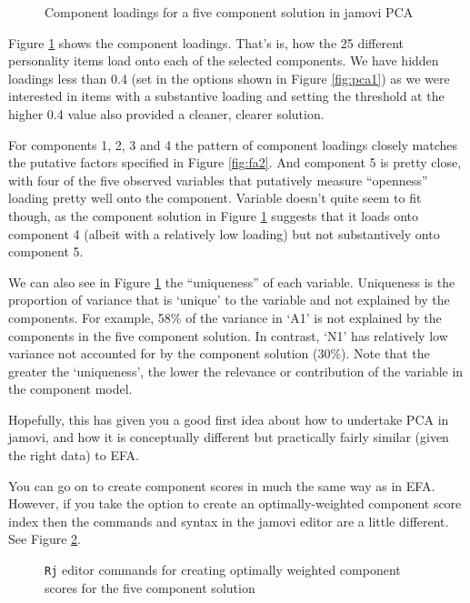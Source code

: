 \begin{figure}[!htb]
\begin{center}
\caption{Component loadings for a five component solution in jamovi PCA}
\label{fig:pca5}
\HR
\end{center}
\end{figure}

Figure \ref{fig:pca5} shows the component loadings. That's is, how the 25 different personality items load onto each of the selected components. We have hidden loadings less than 0.4 (set in the options shown in Figure \ref{fig:pca1}) as we were interested in items with a substantive loading and setting the threshold at the higher 0.4 value also provided a cleaner, clearer solution. 

For components 1, 2, 3 and 4 the pattern of component loadings closely matches the putative factors specified in Figure \ref{fig:fa2}. And component 5 is pretty close, with four of the five observed variables that putatively measure “openness” loading pretty well onto the component. Variable  doesn’t quite seem to fit though, as the component solution in Figure \ref{fig:pca5} suggests that it loads onto component 4 (albeit with a relatively low loading) but not substantively onto component 5.

We can also see in Figure \ref{fig:pca5} the “uniqueness” of each variable. Uniqueness is the proportion of variance that is ‘unique’ to the variable and not explained by the components. For example, 58\% of the variance in ‘A1’ is not explained by the components in the five component solution. In contrast, ‘N1’ has relatively low variance not accounted for by the component solution (30\%). Note that the greater the ‘uniqueness’, the lower the relevance or contribution of the variable in the component model. 

Hopefully, this has given you a good first idea about how to undertake PCA in jamovi, and how it is conceptually different but practically fairly similar (given the right data) to EFA.

You can go on to create component scores in much the same way as in EFA. However, if you take the option to create an optimally-weighted component score index then the commands and syntax in the jamovi  editor are a little different. See Figure \ref{fig:pca6}. 

\begin{figure}[!htb]
\begin{center}
\caption{\texttt{Rj} editor commands for creating optimally weighted component scores for the five component solution}
\label{fig:pca6}
\HR
\end{center}
\end{figure}


